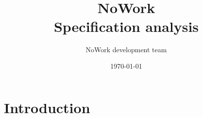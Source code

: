 \documentclass[12pt,a4paper]{article}
\title{NoWork\\
Specification analysis}
\author{NoWork development team\\[2em]}
\date\today
\begin{document}
\maketitle

\section{Introduction}
\end{document}
